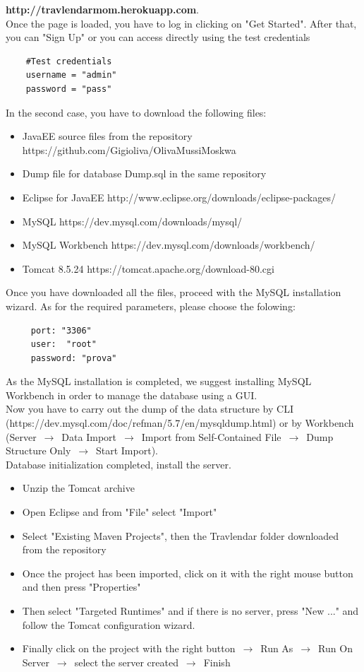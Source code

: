 \documentclass[numbers=noenddot, 12pt, a4paper, oneside]{scrbook}
\begin{document}
\textbf{http://travlendarmom.herokuapp.com}.\\

Once the page is loaded, you have to log in clicking on "Get Started". After that, you can "Sign Up" or you can access directly using the test credentials
\begin{lstlisting}
	#Test credentials
	username = "admin"
	password = "pass"
\end{lstlisting}

In the second case, you have to download the following files:
\begin{itemize}
	\item JavaEE source files from the repository https://github.com/Gigioliva/OlivaMussiMoskwa
	\item Dump file for database Dump.sql in the same repository
	\item Eclipse for JavaEE http://www.eclipse.org/downloads/eclipse-packages/
	\item MySQL https://dev.mysql.com/downloads/mysql/
	\item MySQL Workbench https://dev.mysql.com/downloads/workbench/
	\item Tomcat 8.5.24 https://tomcat.apache.org/download-80.cgi
\end{itemize}
Once you have downloaded all the files, proceed with the MySQL installation wizard. As for the required parameters, please choose the folowing:
\begin{lstlisting}
	 port: "3306"
	 user:  "root"
	 password: "prova"
\end{lstlisting}

As the MySQL installation is completed, we suggest installing MySQL Workbench in order to manage the database using a GUI. \\
Now you have to carry out the dump of the data structure by CLI\\
(https://dev.mysql.com/doc/refman/5.7/en/mysqldump.html)
or by Workbench (Server $\,\to\,$ Data Import $\,\to\,$ Import from Self-Contained File $\,\to\,$ Dump Structure Only $\,\to\,$ Start Import).\\

Database initialization completed, install the server.

\begin{itemize}
	\item Unzip the Tomcat archive
	\item Open Eclipse and from "File" select "Import"
	\item Select "Existing Maven Projects", then the Travlendar folder downloaded from the repository
	\item Once the project has been imported, click on it with the right mouse button and then press "Properties"
	\item Then select "Targeted Runtimes" and if there is no server, press "New ..." and follow the Tomcat configuration wizard.
	\item Finally click on the project with the right button $\,\to\,$  Run As $\,\to\,$ Run On Server $\,\to\,$ select the server created $\,\to\,$ Finish
\end{itemize}
\end{document}
